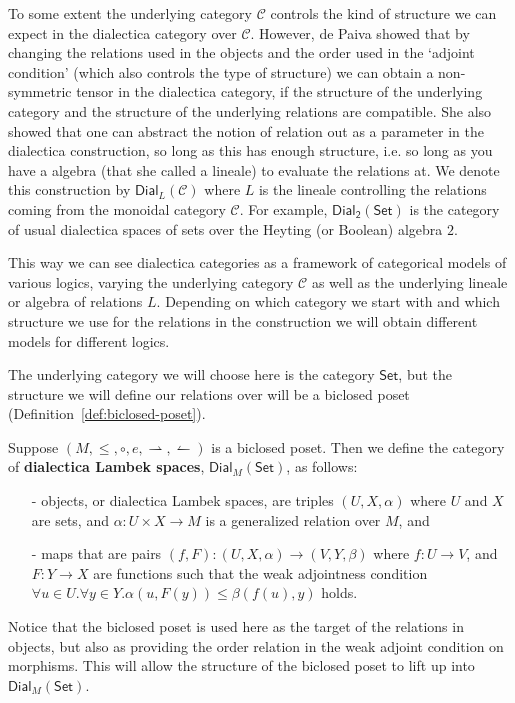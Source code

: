 \documentclass{llncs}
\let\mto\to                     %
\let\to\relax                   %
\newcommand{\to}{\rightarrow}
\newcommand{\rto}{\leftharpoonup}
\newcommand{\lto}{\rightharpoonup}
\newcommand{\cat}[1]{\mathcal{#1}}
\newcommand{\Set}{\mathsf{Set}}
\newcommand{\Dial}[2]{\mathsf{Dial}_{#1}(#2)}
\begin{document}
To some extent the underlying category $\cat{C}$ controls the kind of
structure we can expect in the dialectica category over $\cat{C}$. However,
de Paiva  showed \cite{depaiva2007} that by changing the relations used in
the objects and the order used in the  `adjoint condition' (which also
controls the type of structure) we can obtain a non-symmetric tensor in the dialectica category, if the structure of the underlying category and the structure of the underlying relations are compatible. 
She also showed that one can
abstract the notion of relation out as a parameter in the dialectica
construction, so long as this has enough structure, i.e. so long as you have a algebra (that she called a lineale) to evaluate the relations at. 
We denote this construction by $\mathsf{Dial}_{L}(\cat{C})$ where $L$ is the lineale controlling the relations coming from the monoidal category $\cat{C}$. For example, $\mathsf{Dial}_{\mathsf{2}}(\Set)$ is the
category of usual dialectica spaces of sets over the Heyting (or Boolean) algebra $2$. 

This way we can see dialectica categories as a framework of categorical models of various logics, varying the underlying category $\cat{C}$ as well as the underlying lineale or algebra of relations $L$. Depending on which category we start with and which structure we use for the relations in the construction we will obtain different models for different logics.

The underlying category we will choose here is the category $\Set$,
but the structure we will define our relations over will be a biclosed
poset (Definition~\ref{def:biclosed-poset}).
\begin{definition}
  \label{def:dialectica-lambek-spaces}
  Suppose $(M, \leq, \circ, e, \lto, \rto)$ is a biclosed poset. Then
  we define the category of \textbf{dialectica Lambek spaces},
  $\mathsf{Dial}_M(\Set)$, as follows:
  \begin{itemize}
  \item[-] objects, or dialectica Lambek spaces, are triples $(U, X,
    \alpha)$ where $U$ and $X$ are sets, and $\alpha : U \times X \mto
    M$ is a generalized relation over $M$, and

  \item[-] maps that are pairs $(f, F) : (U , X, \alpha) \mto (V , Y ,
    \beta)$ where $f : U \mto V$, and $F : Y \mto X$ are functions
    such that the weak adjointness condition
    $\forall u \in U.\forall y \in Y. \alpha(u , F(y)) \leq \beta(f(u), y)$
    holds.
  \end{itemize}
\end{definition}
Notice that the biclosed poset is used here as the target of the
relations in objects, but also as providing the order  relation in the weak adjoint condition on morphisms.  This will allow the structure of the biclosed
poset to lift up into $\Dial{M}{\Set}$.
\end{document}
